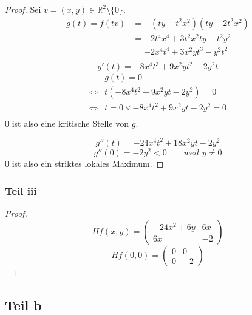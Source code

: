 \documentclass[10pt,a4paper]{article}
\begin{document}
\begin{proof}
Sei $v = (x, y) \in \mathbb{R}^{2} \setminus \{0\}$.
\begin{align*}
g(t) = f(tv) & = -(ty - t^{2}x^{2})(ty - 2t^{2}x^{2})\\
& = -2t^{4}x^{4} + 3t^{2}x^{2}ty - t^{2}y^{2}\\
& = -2x^{4}t^{4} + 3x^{2}yt^{3} - y^{2}t^{2}\\
\end{align*}
\begin{equation}
g'(t) = -8x^{4}t^{3} + 9x^{2}yt^{2} - 2y^{2}t
\end{equation}
\begin{align*}
& g(t) = 0\\
\Leftrightarrow & t(-8x^{4}t^{2} + 9x^{2}yt - 2y^{2}) = 0\\
\Leftrightarrow & t = 0 \lor -8x^{4}t^{2} + 9x^{2}yt - 2y^{2} = 0\\
\end{align*}
$0$ ist also eine kritische Stelle von $g$.

\begin{equation}
g''(t) = -24x^{4}t^{2} + 18x^{2}yt - 2y^{2}
\end{equation}
\begin{equation}
g''(0) = -2y^{2} < 0 \qquad \textit{weil $y \ne 0$}
\end{equation}
$0$ ist also ein striktes lokales Maximum.
\end{proof}

\subsubsection*{Teil iii}

\begin{proof}
\begin{equation}
Hf(x, y) = \begin{pmatrix}
-24x^{2} + 6y & 6x\\
6x & -2
\end{pmatrix}
\end{equation}
\begin{equation}
Hf(0, 0) = \begin{pmatrix}
0 & 0\\
0 & -2
\end{pmatrix}
\end{equation}
\end{proof}

\subsection*{Teil b}
\end{document}
